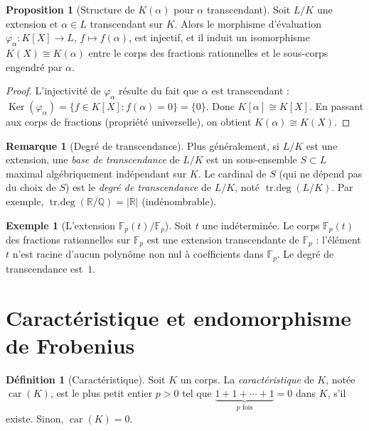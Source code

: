 \documentclass[12pt,a4paper,openany]{book}
\theoremstyle{definition}
\newtheorem{definition}{Définition}[chapter]
\newtheorem{proposition}{Proposition}[chapter]
\newtheorem{remarque}{Remarque}[chapter]
\newtheorem{exemple}{Exemple}[chapter]
\newcommand{\Q}{\mathbb{Q}}
\newcommand{\R}{\mathbb{R}}
\newcommand{\F}{\mathbb{F}}
\newcommand{\Ker}{\operatorname{Ker}}
\newcommand{\car}{\operatorname{car}}
\begin{document}
\begin{proposition}[Structure de $K(\alpha)$ pour $\alpha$ transcendant]
\label{prop:transcendant}
Soit $L/K$ une extension et $\alpha \in L$ transcendant sur $K$. Alors le
morphisme d'évaluation $\varphi_\alpha \colon K[X] \to L$, $f \mapsto f(\alpha)$,
est injectif, et il induit un isomorphisme $K(X) \cong K(\alpha)$ entre le corps
des fractions rationnelles et le sous-corps engendré par $\alpha$.
\end{proposition}

\begin{proof}
L'injectivité de $\varphi_\alpha$ résulte du fait que $\alpha$ est transcendant :
$\Ker(\varphi_\alpha) = \{f \in K[X] : f(\alpha) = 0\} = \{0\}$. Donc
$K[\alpha] \cong K[X]$. En passant aux corps de fractions (propriété universelle),
on obtient $K(\alpha) \cong K(X)$.
\end{proof}

\begin{remarque}[Degré de transcendance]
\label{rem:degre-transcendance}
Plus généralement, si $L/K$ est une extension, une \emph{base de transcendance}
de $L/K$ est un sous-ensemble $S \subset L$ maximal algébriquement indépendant
sur $K$. Le cardinal de $S$ (qui ne dépend pas du choix de $S$) est le
\emph{degré de transcendance} de $L/K$, noté $\operatorname{tr.deg}(L/K)$.
Par exemple, $\operatorname{tr.deg}(\R/\Q) = |\R|$ (indénombrable).
\end{remarque}

\begin{exemple}[L'extension $\F_p(t)/\F_p$]\label{ex:Fpt}
Soit $t$ une indéterminée. Le corps $\F_p(t)$ des fractions rationnelles sur
$\F_p$ est une extension transcendante de $\F_p$ : l'élément $t$ n'est racine
d'aucun polynôme non nul à coefficients dans $\F_p$. Le degré de transcendance
est~$1$.
\end{exemple}

\section{Caractéristique et endomorphisme de Frobenius}
\label{sec:caracteristique}

\begin{definition}[Caractéristique]\label{def:caracteristique}
Soit $K$ un corps. La \emph{caractéristique} de $K$, notée $\car(K)$, est le
plus petit entier $p > 0$ tel que
$\underbrace{1 + 1 + \cdots + 1}_{p \text{ fois}} = 0$ dans $K$, s'il existe.
Sinon, $\car(K) = 0$.
\end{definition}
\end{document}
